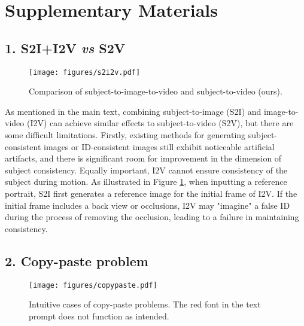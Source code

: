 \section*{Supplementary Materials}
\label{sec:supp}

\subsection*{1. S2I+I2V \textbf{\textit{vs}} S2V}
\label{sec:supp:s2i2v}
\begin{figure}[h]
	\centering
	\texttt{[image: figures/s2i2v.pdf]} 
	\caption{Comparison of subject-to-image-to-video \cite{dreamina} and subject-to-video (ours).}
	\label{fig:s2i2v}
\end{figure}

As mentioned in the main text, combining subject-to-image (S2I) and image-to-video (I2V) can achieve similar effects to subject-to-video (S2V), but there are some difficult limitations. Firstly, existing methods \cite{guo2024pulid, huang2024realcustom, dreamina} for generating subject-consistent images or ID-consistent images still exhibit noticeable artificial artifacts, and there is significant room for improvement in the dimension of subject consistency. Equally important, I2V cannot ensure consistency of the subject during motion. As illustrated in Figure \ref{fig:s2i2v}, when inputting a reference portrait, S2I first generates a reference image for the initial frame of I2V. If the initial frame includes a back view or occlusions, I2V may "imagine" a false ID during the process of removing the occlusion, leading to a failure in maintaining consistency.


\subsection*{2. Copy-paste problem}
\label{sec:supp:copypaste}

\begin{figure}[h]
	\centering
	\texttt{[image: figures/copypaste.pdf]} 
	\caption{Intuitive cases of copy-paste problems. The red font in the text prompt does not function as intended.}
	\label{fig:copypaste}
\end{figure}

